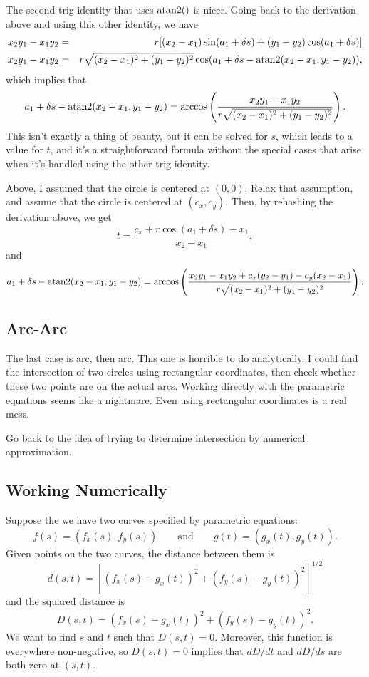 \documentclass[titlepage,oneside,10pt]{article}
\def\atan2{\mathop{\rm atan2}\nolimits}
\begin{document}
The second trig identity that uses $\atan2()$ is nicer. Going back to
the derivation above and using this other identity, we have
\begin{eqnarray*}
x_2y_1-x_1y_2 &=&
r[(x_2-x_1)\sin(a_1+\delta s)+(y_1-y_2)\cos(a_1+\delta s)]\\
x_2y_1-x_1y_2 &=&
r\sqrt{(x_2-x_1)^2+(y_1-y_2)^2}
\cos(a_1+\delta s-\atan2(x_2-x_1,y_1-y_2)),
\end{eqnarray*}
which implies that
$$a_1+\delta s-\atan2(x_2-x_1,y_1-y_2) =
\arccos\left(\frac{x_2y_1-x_1y_2}{r\sqrt{(x_2-x_1)^2+(y_1-y_2)^2}}\right).$$
This isn't exactly a thing of beauty, but it can be solved for $s$,
which leads to a value for $t$, and it's a straightforward formula
without the special cases that arise when it's handled using the other
trig identity.

Above, I assumed that the circle is centered at $(0,0)$. Relax that
assumption, and assume that the circle is centered at
$(c_x,c_y)$. Then, by rehashing the derivation above, we get
$$t = \frac{c_x+r\cos(a_1+\delta s)-x_1}{x_2-x_1},$$
and
$$a_1+\delta s-\atan2(x_2-x_1,y_1-y_2) =
\arccos\left(\frac{x_2y_1-x_1y_2+c_x(y_2-y_1)-c_y(x_2-x_1)}{r\sqrt{(x_2-x_1)^2+(y_1-y_2)^2}}\right).$$

\subsection{Arc-Arc}

The last case is arc, then arc. This one is horrible to do
analytically. I could find the intersection of two circles using
rectangular coordinates, then check whether these two points are on
the actual arcs. Working directly with the parametric equations seems
like a nightmare. Even using rectangular coordinates is a real mess.

Go back to the idea of trying to determine intersection by numerical
approximation. 

\subsection{Working Numerically}

Suppose the we have two curves specified by parametric equations:
$$f(s) = (f_x(s),f_y(s))\qquad\mbox{and}\qquad g(t) = (g_x(t),g_y(t)).$$
Given points on the two curves, the distance between them is
$$d(s,t) = \left[(f_x(s)-g_x(t))^2 + (f_y(s)-g_y(t))^2\right]^{1/2}$$
and the squared distance is
$$D(s,t) = (f_x(s)-g_x(t))^2 + (f_y(s)-g_y(t))^2.$$
We want to find $s$ and $t$ such that $D(s,t)=0$. Moreover, this
function is everywhere non-negative, so $D(s,t) = 0$ implies that
$dD/dt$ and $dD/ds$ are both zero at $(s,t)$.
\end{document}

